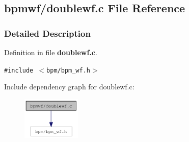 \subsection{bpmwf/doublewf.c File Reference}
\label{doublewf_8c}


\subsubsection{Detailed Description}


Definition in file {\bf doublewf.c}.

{\tt \#include $<$bpm/bpm\_\-wf.h$>$}\par


Include dependency graph for doublewf.c:\nopagebreak
\begin{figure}[H]
\begin{center}
\leavevmode
\includegraphics[width=79pt]{doublewf_8c__incl}
\end{center}
\end{figure}
